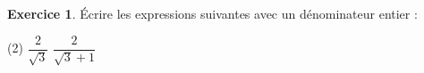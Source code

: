\documentclass{exam}
\theoremstyle{definition}
\newtheorem{exercice}{Exercice}
\begin{document}
\begin{exercice}
Écrire les expressions suivantes avec un dénominateur entier :
\begin{tasks}(2)
    \task $\dfrac{2}{\sqrt{3}}$
    \task $\dfrac{2}{\sqrt{3} + 1}$
\end{tasks}
\begin{center}
    \framebox[1\textwidth]{\parbox{5.5in}{%
    \vspace{10em}}}
\end{center}
\end{exercice}
\end{document}
